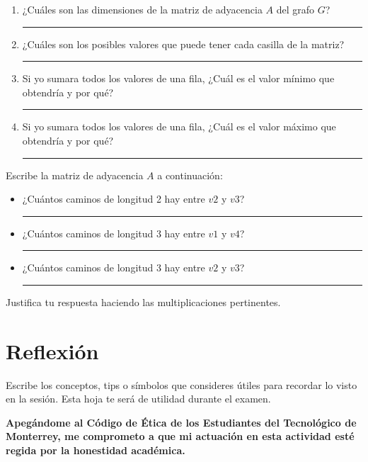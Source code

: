 \documentclass[spanish, 10pt]{article}
\newcommand{\responserule}{{\large\rule{14 cm}{0.3mm}}}
\newcommand{\veryshortresponserule}{{\large\rule{3 cm}{0.3mm}}}
\begin{document}
\begin{enumerate}
    \item ¿Cuáles son las dimensiones de la matriz de adyacencia $A$ del grafo $G$? \hfill \veryshortresponserule
    \item ¿Cuáles son los posibles valores que puede tener cada casilla de la matriz? \hfill \veryshortresponserule
    \item Si yo sumara todos los valores de una fila, ¿Cuál es el valor mínimo que obtendría y por qué? \\[2ex]\responserule
    \item Si yo sumara todos los valores de una fila, ¿Cuál es el valor máximo que obtendría y por qué? \\[2ex]
    \responserule
\end{enumerate}

Escribe la matriz de adyacencia $A$ a continuación:

\vspace{20ex}

\begin{itemize}
    \item ¿Cuántos caminos de longitud 2 hay entre $v2$ y $v3$? \hfill \veryshortresponserule
    \item ¿Cuántos caminos de longitud 3 hay entre $v1$ y $v4$? \hfill \veryshortresponserule
    \item ¿Cuántos caminos de longitud 3 hay entre $v2$ y $v3$? \hfill \veryshortresponserule
\end{itemize}

Justifica tu respuesta haciendo las multiplicaciones pertinentes.

\vspace{65ex}

\section{Reflexión}

Escribe los conceptos, tips o símbolos que consideres útiles para recordar lo visto en la sesión. Esta hoja te será de utilidad durante el examen.

\vfill

\textbf{Apegándome al Código de Ética de los Estudiantes del Tecnológico de Monterrey, me comprometo a que mi actuación en esta actividad esté regida por la honestidad académica.}
\end{document}
